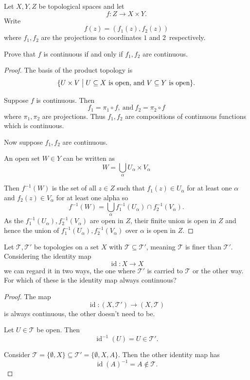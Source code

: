 \documentclass[11pt]{article}
\begin{document}
\begin{prob}
    Let $X,Y,Z$ be topological spaces and let 
    \[
        f : Z \to X \times Y. 
    \]
    Write 
    \[
        f(z) = (f_1(z), f_2(z)) 
    \]
    where $f_1,f_2$ are the projections 
    to coordinates $1$ and $2$ respectively. 

    Prove that $f$ is continuous if and only if 
    $f_1,f_2$ are continuous.
\end{prob}
\begin{proof}
    The basis of the product topology is 
    \[
        \{U \times V \bigm| U \subseteq X \ 
        \text{is open, and} \ V \subseteq Y \ \text{is open}\}.
    \]

    Suppose $f$ is continuous. Then 
    \[
        f_1 = \pi_1 \circ f, \ \text{and} \ 
        f_2 = \pi_2 \circ f
    \]
    where $\pi_1,\pi_2$ are projections. 
    Thus $f_1,f_2$ are compositions of continuous functions 
    which is continuous. 

    Now suppose $f_1,f_2$ are continuous. 

    An open set $W \in Y$ can be written as 
    \[
        W = \bigcup_{\alpha} U_\alpha \times V_\alpha
    \]

    Then 
    $f^{-1}(W)$ is the set of all $z \in Z$ 
    such that $f_1(z) \in U_\alpha$ for at least one 
    $\alpha$ and $f_2(z) \in V_\alpha$ for at least one 
    alpha so 
    \[
        f^{-1}(W) = \bigcup_\alpha f_1^{-1}(U_\alpha) \cap f^{-1}_2(V_\alpha). 
    \]
    As the $f_1^{-1}(U_\alpha), f_2^{-1}(V_\alpha)$ are open 
    in $Z$, their finite union is open in $Z$ and 
    hence the union of $f_1^{-1}(U_\alpha), 
    f_2^{-1}(V_\alpha)$ over $\alpha$ is 
    open in $Z$.
\end{proof}

\begin{prob}
    Let $\mathcal T, \mathcal T'$ be topologies on a set 
    $X$ with $\mathcal T \subseteq \mathcal T'$, meaning 
    $\mathcal T$ is finer than $\mathcal T'$. 
    Considering the identity map 
    \[
        \operatorname{id}: X \to X
    \]
    we can regard it in two ways, the one 
    where $\mathcal T'$ is carried to $\mathcal T$ 
    or the other way. 
    For which of these is the identity map always 
    continuous?
\end{prob}
\begin{proof}
    The map 
    \[
        \operatorname{id} : (X, \mathcal T') \to 
        (X, \mathcal T)
    \]
    is always continuous, the other doesn't 
    need to be. 

    Let $U \in \mathcal T$ be open. Then 
    \[
        \operatorname{id}^{-1}(U) = U \in \mathcal T'. 
    \]

    Consider $\mathcal T = \{\emptyset, X\} \subseteq 
    \mathcal T' = \{\emptyset, X, A\}$. 
    Then the other identity map has 
    \[
        \operatorname{id}(A)^{-1} = A \not\in \mathcal T. 
    \]
\end{proof}
\end{document}
